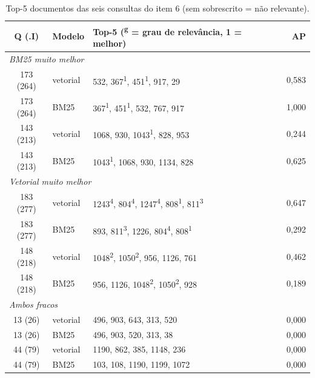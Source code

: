 \documentclass[11pt,a4paper]{article}
\begin{document}
\begin{table}[H]
\centering\footnotesize
\begin{tabular}{clp{7.3cm}r}
\toprule
Q (.I) & Modelo & Top-5 (\textsuperscript{g} = grau de relevância, 1 = melhor) & AP \\
\midrule
\multicolumn{4}{l}{\textit{BM25 muito melhor}} \\
173 (264) & vetorial & 532, 367\textsuperscript{1}, 451\textsuperscript{1}, 917, 29        & 0,583 \\
173 (264) & BM25     & 367\textsuperscript{1}, 451\textsuperscript{1}, 532, 767, 917        & 1,000 \\
143 (213) & vetorial & 1068, 930, 1043\textsuperscript{1}, 828, 953                          & 0,244 \\
143 (213) & BM25     & 1043\textsuperscript{1}, 1068, 930, 1134, 828                         & 0,625 \\
\midrule
\multicolumn{4}{l}{\textit{Vetorial muito melhor}} \\
183 (277) & vetorial & 1243\textsuperscript{4}, 804\textsuperscript{4}, 1247\textsuperscript{4}, 808\textsuperscript{1}, 811\textsuperscript{3} & 0,647 \\
183 (277) & BM25     & 893, 811\textsuperscript{3}, 1226, 804\textsuperscript{4}, 808\textsuperscript{1} & 0,292 \\
148 (218) & vetorial & 1048\textsuperscript{2}, 1050\textsuperscript{2}, 956, 1126, 761       & 0,462 \\
148 (218) & BM25     & 956, 1126, 1048\textsuperscript{2}, 1050\textsuperscript{2}, 928       & 0,189 \\
\midrule
\multicolumn{4}{l}{\textit{Ambos fracos}} \\
13 (26)   & vetorial & 496, 903, 643, 313, 520                                                & 0,000 \\
13 (26)   & BM25     & 496, 903, 520, 313, 38                                                 & 0,000 \\
44 (79)   & vetorial & 1190, 862, 385, 1148, 236                                              & 0,000 \\
44 (79)   & BM25     & 103, 108, 1190, 1199, 1072                                             & 0,000 \\
\bottomrule
\end{tabular}
\vspace{-2pt}
\caption{Top-5 documentos das seis consultas do item 6 (sem sobrescrito = não relevante).}
\end{table}
\end{document}
